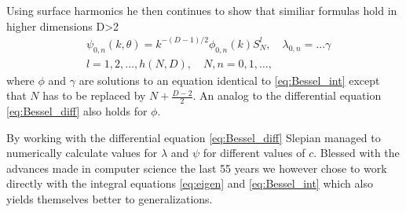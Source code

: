 \documentclass[11pt,a4paper, 
english, swedish %
]{article}
\begin{document}
Using surface harmonics he then continues to show that similiar formulas hold in higher dimensions D>2
\begin{align}
  &\psi_{0,n}(k,\theta)=k^{-(D-1)/2}\phi_{0,n}(k)S_N^l, \quad \lambda_{0,n}= ...\gamma \\
  &l= 1,2, \ldots , h(N,D), \quad N,n=0,1, \ldots,
\end{align}
where $\phi$ and $\gamma$ are solutions to an equation identical to \eqref{eq:Bessel_int} except that $N$ has to be replaced by $N+\frac{D-2}{2}$. An analog to the differential equation \eqref{eq:Bessel_diff} also holds for $\phi$.

By working with the differential equation \eqref{eq:Bessel_diff} Slepian managed to numerically calculate values for $\lambda$ and $\psi$ for different values of $c$. Blessed with the advances made in computer science the last 55 years we however chose to work directly with the integral equations \eqref{eq:eigen} and \eqref{eq:Bessel_int} which also yields themselves better to generalizations.
  








\end{document}

